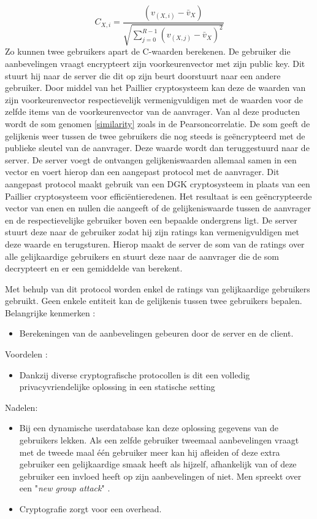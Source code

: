 \begin{equation}\label{c_value}
C_{X,i} = \frac{(v_{(X,i)} - \bar{v}_X)}{\sqrt{\sum_{j=0}^{R-1} (v_{(X,j)} - \bar{v}_X)^2}}\end{equation}
Zo kunnen twee gebruikers apart de C-waarden berekenen. De gebruiker die aanbevelingen vraagt encrypteert zijn voorkeurenvector met zijn public key. Dit stuurt hij naar de server die dit op zijn beurt doorstuurt naar een andere gebruiker. Door middel van het Paillier cryptosysteem kan deze de waarden van zijn voorkeurenvector respectievelijk vermenigvuldigen met de waarden voor de zelfde items van de voorkeurenvector van de aanvrager.  Van al deze producten wordt de som genomen \eqref{similarity} zoals in de Pearsoncorrelatie. De som geeft de gelijkenis weer tussen de twee gebruikers die nog steeds is ge\"encrypteerd met de publieke sleutel van de aanvrager. Deze waarde wordt dan teruggestuurd naar de server. De server voegt de ontvangen gelijkeniswaarden allemaal samen in een vector en voert hierop dan een aangepast protocol met de aanvrager. Dit aangepast protocol maakt gebruik van een DGK cryptosysteem in plaats van een Paillier cryptosysteem voor effici\"entieredenen. Het resultaat is een ge\"encrypteerde vector van enen en nullen die aangeeft of  de gelijkeniswaarde tussen de aanvrager en de respectievelijke gebruiker boven een bepaalde ondergrens ligt. De server stuurt deze naar de gebruiker zodat hij zijn ratings kan vermenigvuldigen met deze waarde en terugsturen. Hierop maakt de server de som van de ratings over alle gelijkaardige gebruikers en stuurt deze naar de aanvrager die de som decrypteert en er een gemiddelde van berekent.

Met behulp van dit protocol worden enkel de ratings van gelijkaardige gebruikers gebruikt. Geen enkele entiteit kan de gelijkenis tussen twee gebruikers bepalen.\\



Belangrijke kenmerken :
\begin{itemize}

\item Berekeningen van de aanbevelingen gebeuren door de server en de client.
\end{itemize}
Voordelen : 
\begin{itemize}
\item Dankzij diverse cryptografische protocollen is dit een volledig privacyvriendelijke oplossing in een statische setting
\end{itemize}
Nadelen:
\begin{itemize}
\item Bij een dynamische userdatabase kan deze oplossing gegevens van de gebruikers lekken. Als een zelfde gebruiker tweemaal aanbevelingen vraagt met de tweede maal \'e\'en gebruiker meer kan hij afleiden of deze extra gebruiker een gelijkaardige smaak heeft als hijzelf, afhankelijk van of deze gebruiker een invloed heeft op zijn aanbevelingen of niet. Men spreekt over een "\emph{new group attack}" \cite{kononchuk2013privacy}.
\item Cryptografie zorgt voor een overhead.

\end{itemize}
